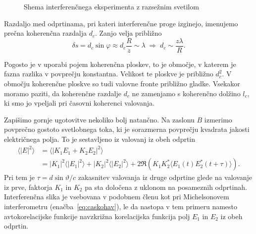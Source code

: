 \begin{figure}[h]
\centering
\def\svgwidth{140truemm} 

\caption{Shema interferenčnega eksperimenta z razsežnim svetilom}
\label{fig:shema-interferenca}
\end{figure}

Razdaljo med odprtinama, pri kateri interferenčne proge
izginejo, imenujemo prečna koherenčna razdalja $d_c$. 
Zanjo velja približno 
\begin{equation}
\delta s = d_c\sin\varphi\approx d_c\frac{R}{z}\sim\lambda\;\Rightarrow\;
d_{c}\sim\frac{z\lambda}{R}.
\label{eq:prost_koh}
\end{equation}
\begin{remark}
Pogosto je v uporabi
pojem koherenčna ploskev, to je območje, 
v katerem je fazna razlika v povprečju konstantna. Velikost te ploskve je približno $d_{c}^{2}$.
V območju koherenčne ploskve so tudi valovne fronte približno gladke.
Vsekakor moramo paziti, da koherenčne razdalje $d_c$ ne zamenjamo
s koherenčno dolžino $l_c$, ki smo jo vpeljali pri časovni koherenci valovanja. 
\end{remark}

Zapišimo gornje ugotovitve nekoliko bolj natančno. Na zaslonu $B$
izmerimo povprečno gostoto svetlobnega toka, ki je sorazmerna povprečju kvadrata
jakosti električnega polja. To je sestavljeno iz valovanj iz obeh odprtin
\begin{align}
\langle|E|^{2}\rangle & =\langle|K_{1}E_{1}+K_{2}E_{2}|^{2}\rangle\nonumber \\
&=  |K_{1}|^{2}\langle|E_{1}|^{2}\rangle+|K_{2}|^{2}\langle|E_{2}|^{2}\rangle+
2\Re \left( K_{1}K_{2}^{*}\langle E_{1}(t)E_{2}^{*}(t+\tau)\rangle\right).
\end{align}
Pri tem je $\tau=d\sin\vartheta/c$ zakasnitev valovanja iz druge odprtine
glede na valovanje iz prve, faktorja $K_{1}$ in $K_{2}$ pa sta določena
z uklonom na posameznih odprtinah. Interferenčna slika je vsebovana v podobnem 
členu kot pri Michelsonovem interferometru (enačba~\ref{eq:caskohav}), 
le da nastopa v tem primeru namesto avtokorelacijske funkcije
navzkrižna korelacijska funkcija polj $E_{1}$ in $E_{2}$ iz obeh 
odprtin. 

